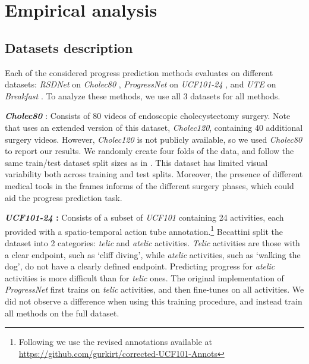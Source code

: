 \section{Empirical analysis}
\label{sec:experiment}
\subsection{Datasets description}

Each of the considered progress prediction methods evaluates on different datasets: \textsl{RSDNet} on \textsl{Cholec80} \cite{twinanda2016}, \textsl{ProgressNet} on \textsl{UCF101-24} \cite{soomro2012}, and \textsl{UTE} on \textsl{Breakfast} \cite{kuehne2014, kuehne2016}. 
To analyze these methods, we use all 3 datasets for all methods. 

\smallskip\noindent\textbf{\textsl{Cholec80} \cite{twinanda2016}}: Consists of 80 videos of endoscopic cholecystectomy surgery.  
Note that \cite{twinanda2019} uses an extended version of this dataset, \textsl{Cholec120}, containing 40 additional surgery videos. 
However, \textsl{Cholec120} is not publicly available, so we used \textsl{Cholec80} to report our results. 
We randomly create four folds of the data, and follow the same train\slash test dataset split sizes as in \cite{twinanda2019}. 
This dataset has limited visual variability both across training and test splits.
Moreover, the presence of different medical tools in the frames informs of the different surgery phases, which could aid the progress prediction task.

\smallskip\noindent\textbf{\textsl{UCF101-24} \cite{soomro2012}:} Consists of a subset of \textsl{UCF101} containing 24 activities, each provided with a spatio-temporal action tube annotation.\footnote{Following \cite{becattini2017} we use the revised annotations available at \url{https://github.com/gurkirt/corrected-UCF101-Annots}} 
Becattini \etal \cite{becattini2017} split the dataset into 2 categories: \textsl{telic} and \textsl{atelic} activities.
\textsl{Telic} activities are those with a clear endpoint, such as `cliff diving', while \textsl{atelic} activities, such as `walking the dog', do not have a clearly defined endpoint. 
Predicting progress for \textsl{atelic} activities is more difficult than for \textsl{telic} ones.
The original implementation of \textsl{ProgressNet} first trains on \textsl{telic} activities, and then fine-tunes on all activities. 
We did not observe a difference when using this training procedure, and instead train all methods on the full dataset.

